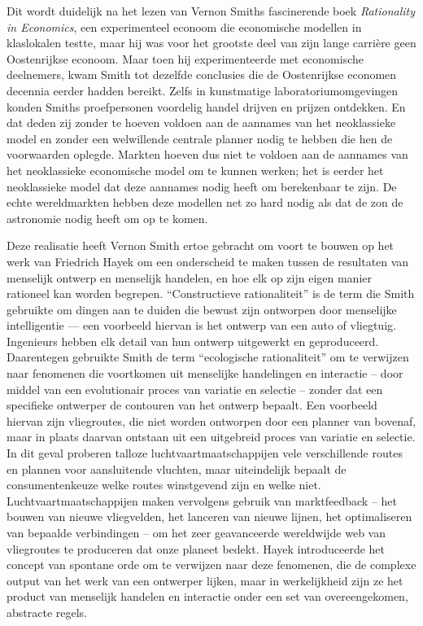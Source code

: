 Dit wordt duidelijk na het lezen van Vernon Smith\textquotesingle s fascinerende boek \emph{Rationality in Economics}, een experimenteel econoom die economische modellen in klaslokalen testte, maar hij was voor het grootste deel van zijn lange carrière geen Oostenrijkse econoom.\autocite{192} Maar toen hij experimenteerde met economische deelnemers, kwam Smith tot dezelfde conclusies die de Oostenrijkse economen decennia eerder hadden bereikt. Zelfs in kunstmatige laboratoriumomgevingen konden Smith\textquotesingle s proefpersonen voordelig handel drijven en prijzen ontdekken. En dat deden zij zonder te hoeven voldoen aan de aannames van het neoklassieke model en zonder een welwillende centrale planner nodig te hebben die hen de voorwaarden oplegde. Markten hoeven dus niet te voldoen aan de aannames van het neoklassieke economische model om te kunnen werken; het is eerder het neoklassieke model dat deze aannames nodig heeft om berekenbaar te zijn. De echte wereldmarkten hebben deze modellen net zo hard nodig als dat de zon de astronomie nodig heeft om op te komen.

Deze realisatie heeft Vernon Smith ertoe gebracht om voort te bouwen op het werk van Friedrich Hayek om een onderscheid te maken tussen de resultaten van menselijk ontwerp en menselijk handelen, en hoe elk op zijn eigen manier rationeel kan worden begrepen.\autocite{193} ``Constructieve rationaliteit'' is de term die Smith gebruikte om dingen aan te duiden die bewust zijn ontworpen door menselijke intelligentie --- een voorbeeld hiervan is het ontwerp van een auto of vliegtuig. Ingenieurs hebben elk detail van hun ontwerp uitgewerkt en geproduceerd. Daarentegen gebruikte Smith de term ``ecologische rationaliteit'' om te verwijzen naar fenomenen die voortkomen uit menselijke handelingen en interactie -- door middel van een evolutionair proces van variatie en selectie -- zonder dat een specifieke ontwerper de contouren van het ontwerp bepaalt. Een voorbeeld hiervan zijn vliegroutes, die niet worden ontworpen door een planner van bovenaf, maar in plaats daarvan ontstaan uit een uitgebreid proces van variatie en selectie. In dit geval proberen talloze luchtvaartmaatschappijen vele verschillende routes en plannen voor aansluitende vluchten, maar uiteindelijk bepaalt de consumentenkeuze welke routes winstgevend zijn en welke niet. Luchtvaartmaatschappijen maken vervolgens gebruik van marktfeedback -- het bouwen van nieuwe vliegvelden, het lanceren van nieuwe lijnen, het optimaliseren van bepaalde verbindingen -- om het zeer geavanceerde wereldwijde web van vliegroutes te produceren dat onze planeet bedekt. Hayek introduceerde het concept van spontane orde om te verwijzen naar deze fenomenen, die de complexe output van het werk van een ontwerper lijken, maar in werkelijkheid zijn ze het product van menselijk handelen en interactie onder een set van overeengekomen, abstracte regels.

